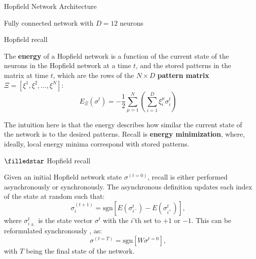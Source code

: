 \documentclass[]{beamer}
\begin{document}
\begin{frame}{Hopfield Network Architecture}
  \centering

  \vspace{0.5cm}
  Fully connected network with $D=12$ neurons
\end{frame}

\begin{frame}{Hopfield recall}
  \begin{definition}\label{def:hopfield-energy}
    The \textbf{energy} of a Hopfield network is a function of the
    current state of the
    neurons in the Hopfield network at a time $t$, and the stored
    patterns in the matrix at time $t$,
    which are the rows of the $N \times D$ \textbf{pattern matrix}
    $\Xi = [\xi^1, \xi^2, \dots, \xi^N]$:
    $$
    E_\Xi (\sigma^t) = - \frac{1}{2} \sum^N_{\mu = 1} \left(
    \sum^D_{i=1} \xi^\mu_i \sigma_i^t \right)
    $$
  \end{definition}

  The intuition here is that the energy describes how similar the
  current state of the network is to
  the desired patterns. Recall is \textbf{energy minimization},
  where, ideally, local energy minima correspond
  with stored patterns.
\end{frame}

\begin{frame}{$\filledstar$ Hopfield recall}
  \begin{definition}\label{def:hopfield-recall}
    Given an initial Hopfield network state $\sigma^{(t=0)}$, recall
    is either performed asynchronously or
    synchronously. The asynchronous definition updates each index of
    the state at random such that:
    $$
    \sigma^{(t+1)}_i = \text{sgn}\left[ E(\sigma^t_{i^-}) -
    E(\sigma^{t}_{i^+}) \right],
    $$
    where $\sigma^{t}_{i\pm}$ is the state vector $\sigma^t$ with the
    $i$'th set to $+1$ or $-1$.
    This can be reformulated synchronously \parencite{krotov_modern_2025}, as:
    $$
    \sigma^{(t=T)} = \text{sgn} \left[ W \sigma^{t=0} \right],
    $$
    with $T$ being the final state of the network.
  \end{definition}
\end{frame}
\end{document}

